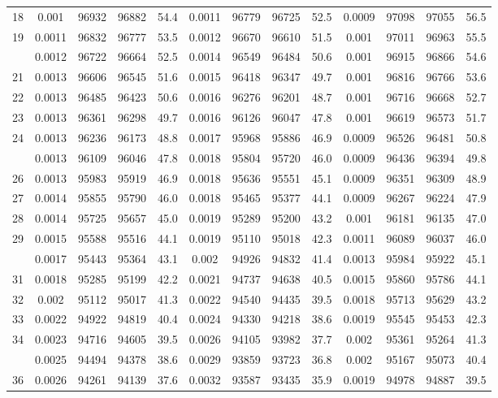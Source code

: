 \documentclass[
  14pt,
]{article}
\begin{document}
\begin{longtable}[t]{lcccccccccccc}
18 & 0.001 & 96932 & 96882 & 54.4 & 0.0011 & 96779 & 96725 & 52.5 & 0.0009 & 97098 & 97055 & 56.5\\
19 & 0.0011 & 96832 & 96777 & 53.5 & 0.0012 & 96670 & 96610 & 51.5 & 0.001 & 97011 & 96963 & 55.5\\
\addlinespace
20 & 0.0012 & 96722 & 96664 & 52.5 & 0.0014 & 96549 & 96484 & 50.6 & 0.001 & 96915 & 96866 & 54.6\\
21 & 0.0013 & 96606 & 96545 & 51.6 & 0.0015 & 96418 & 96347 & 49.7 & 0.001 & 96816 & 96766 & 53.6\\
22 & 0.0013 & 96485 & 96423 & 50.6 & 0.0016 & 96276 & 96201 & 48.7 & 0.001 & 96716 & 96668 & 52.7\\
23 & 0.0013 & 96361 & 96298 & 49.7 & 0.0016 & 96126 & 96047 & 47.8 & 0.001 & 96619 & 96573 & 51.7\\
24 & 0.0013 & 96236 & 96173 & 48.8 & 0.0017 & 95968 & 95886 & 46.9 & 0.0009 & 96526 & 96481 & 50.8\\
\addlinespace
25 & 0.0013 & 96109 & 96046 & 47.8 & 0.0018 & 95804 & 95720 & 46.0 & 0.0009 & 96436 & 96394 & 49.8\\
26 & 0.0013 & 95983 & 95919 & 46.9 & 0.0018 & 95636 & 95551 & 45.1 & 0.0009 & 96351 & 96309 & 48.9\\
27 & 0.0014 & 95855 & 95790 & 46.0 & 0.0018 & 95465 & 95377 & 44.1 & 0.0009 & 96267 & 96224 & 47.9\\
28 & 0.0014 & 95725 & 95657 & 45.0 & 0.0019 & 95289 & 95200 & 43.2 & 0.001 & 96181 & 96135 & 47.0\\
29 & 0.0015 & 95588 & 95516 & 44.1 & 0.0019 & 95110 & 95018 & 42.3 & 0.0011 & 96089 & 96037 & 46.0\\
\addlinespace
30 & 0.0017 & 95443 & 95364 & 43.1 & 0.002 & 94926 & 94832 & 41.4 & 0.0013 & 95984 & 95922 & 45.1\\
31 & 0.0018 & 95285 & 95199 & 42.2 & 0.0021 & 94737 & 94638 & 40.5 & 0.0015 & 95860 & 95786 & 44.1\\
32 & 0.002 & 95112 & 95017 & 41.3 & 0.0022 & 94540 & 94435 & 39.5 & 0.0018 & 95713 & 95629 & 43.2\\
33 & 0.0022 & 94922 & 94819 & 40.4 & 0.0024 & 94330 & 94218 & 38.6 & 0.0019 & 95545 & 95453 & 42.3\\
34 & 0.0023 & 94716 & 94605 & 39.5 & 0.0026 & 94105 & 93982 & 37.7 & 0.002 & 95361 & 95264 & 41.3\\
\addlinespace
35 & 0.0025 & 94494 & 94378 & 38.6 & 0.0029 & 93859 & 93723 & 36.8 & 0.002 & 95167 & 95073 & 40.4\\
36 & 0.0026 & 94261 & 94139 & 37.6 & 0.0032 & 93587 & 93435 & 35.9 & 0.0019 & 94978 & 94887 & 39.5\\

\end{longtable}
\end{document}
